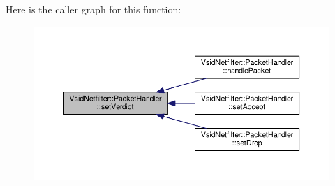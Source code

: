 Here is the caller graph for this function\-:
\nopagebreak
\begin{figure}[H]
\begin{center}
\leavevmode
\includegraphics[width=350pt]{class_vsid_netfilter_1_1_packet_handler_abb5ca3f313ceaed495dd06ce56bdf849_icgraph}
\end{center}
\end{figure}


